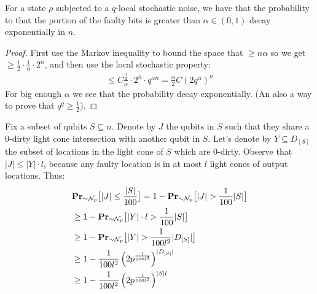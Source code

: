 \begin{claim}
  \label{calim:markov}
  For a state $\rho$ subjected to a $q$-local stochastic noise, we have that the probability to that the portion of the faulty bits is greater than $\alpha \in \left( 0, 1 \right)$ decay exponentially in $n$.
\end{claim}

\begin{proof}
First use the Markov inequality to bound the space that $ \ge n\alpha $ so we get $\ge \frac{1}{2} \cdot \frac{1}{\alpha} \cdot 2^{n}$, and then use the local stochastic property:   
\begin{equation*}
  \begin{split}
    \le C \frac{ \frac{1}{2} }{ \alpha } \cdot 2^{n} \cdot q^{\alpha n} = \frac{\alpha}{2} C \left( 2 q^{\alpha} \right)^{n}
  \end{split}
\end{equation*}
For big enough $\alpha$ we see that the probability decay exponentially. (An also a way to prove that $q^{q} \ge \frac{1}{2}$). 

\end{proof}

Fix a subset of qubits $S \subseteq n$. Denote by $J$ the qubits in $S$ such that they share a $0$-dirty light cone intersection with another qubit in $S$. Let's denote by $Y \subseteq D_{[S]}$ the subset of locations in the light cone of $S$ which are $0$-dirty. Observe that $|J| \le |Y| \cdot l$, because any faulty location is in at most $l$ light cones of output locations. Thus:
\begin{equation*}
  \begin{split}
    & \prbm{ |J| \le \frac{|S|}{100}  }{ \sim \mathcal{N}_{p}  }   =
    1 - \prbm{ |J|  > \frac{1}{100} |S|   }{ \sim \mathcal{N}_{p}} \\ 
   & \ge 1 - \prbm{ |Y| \cdot l  > \frac{1}{100} |S|   }{ \sim \mathcal{N}_{p}} \\
   & \ge 1 - \prbm{ |Y|  > \frac{1}{100 l^{2} } |D_{[S]}|   }{ \sim \mathcal{N}_{p}} \\
     & \ge 1 - \frac{1}{100 l^{2}} \left( 2 p ^{\frac{1}{100 l^{2}}} \right)^{|D_{[S]}| } \\
    & \ge 1 - \frac{1}{100 l^{2}} \left( 2 p ^{\frac{1}{100 l^{2}}} \right)^{|S| l }
  \end{split}
\end{equation*}




